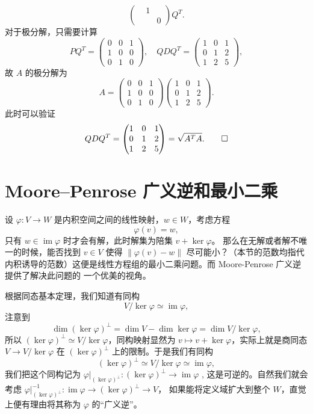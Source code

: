 \documentclass[fontset=none,zihao=-4]{Notes}
\DeclareMathOperator\im{im}
\newcommand{\norm}[1]{\left\lVert#1\right\rVert}
\begin{document}
\begin{solution}
\[\begin{pmatrix}
      & 1 \\
      & & 0
    \end{pmatrix}Q^T.
  \]
  对于极分解，只需要计算
  \[
    PQ^T=\begin{pmatrix}
      0 & 0 & 1\\
      1 & 0 & 0 \\
      0 & 1 & 0
    \end{pmatrix}  ,\quad 
    QDQ^T=\begin{pmatrix}
      1 & 0 & 1\\
      0 & 1 & 2\\
      1 & 2 & 5
    \end{pmatrix},
  \]
  故 $A$ 的极分解为
  \[
    A=  \begin{pmatrix}
      0 & 0 & 1\\
      1 & 0 & 0 \\
      0 & 1 & 0
    \end{pmatrix}\begin{pmatrix}
      1 & 0 & 1\\
      0 & 1 & 2\\
      1 & 2 & 5
    \end{pmatrix}.
  \]
  此时可以验证
  \[
    QDQ^T=\begin{pmatrix}
      1 & 0 & 1\\
      0 & 1 & 2\\
      1 & 2 & 5
    \end{pmatrix}=\sqrt{A^TA}.\qedhere
  \]
\end{solution}

\section{Moore–Penrose 广义逆和最小二乘}

设 $\varphi:V\to W$ 是内积空间之间的线性映射，$w\in W$，考虑方程
\[
  \varphi(v)=w,  
\]
只有 $w\in\im\varphi$ 时才会有解，此时解集为陪集 $v+\ker\varphi$。
那么在无解或者解不唯一的时候，能否找到 $v\in V$ 使得 $\norm{\varphi(v)-w}$
尽可能小？（本节的范数均指代内积诱导的范数）这便是线性方程组的最小二乘问题。而 Moore-Penrose 广义逆提供了解决此问题的
一个优美的视角。

根据同态基本定理，我们知道有同构
\[
  V/\ker\varphi\simeq \im\varphi,  
\]
注意到
\[
  \dim (\ker\varphi)^\bot= \dim V-\dim\ker\varphi=\dim V/\ker\varphi,
\]
所以 $(\ker\varphi)^\bot\simeq V/\ker\varphi$，同构映射显然为
$v\mapsto v+\ker\varphi$，实际上就是商同态 $V\to V/\ker\varphi$
在 $(\ker\varphi)^\bot$ 上的限制。于是我们有同构
\[
  (\ker\varphi)^\bot\simeq V/\ker\varphi\simeq \im\varphi,  
\]
我们把这个同构记为 $\varphi|_{(\ker\varphi)^\bot}:(\ker\varphi)^\bot\to \im\varphi$ ,
这是可逆的。自然我们就会考虑 $\varphi|_{(\ker\varphi)^\bot}^{-1}:\im\varphi\to (\ker\varphi)^\bot\to V$，
如果能将定义域扩大到整个 $W$，直觉上便有理由将其称为 $\varphi$ 的“广义逆”。
\end{document}
